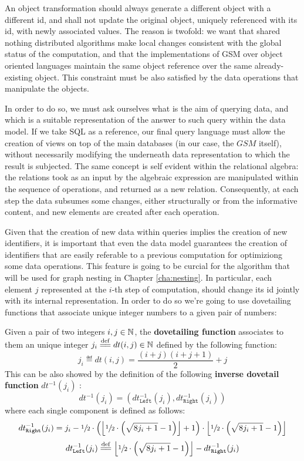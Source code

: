 An object transformation should always generate a different object with a different id, and shall not update the original object, uniquely referenced with its id, with newly associated values. The reason is twofold: we want that shared nothing distributed algorithms make local changes consistent with the global status of the computation, and that the implementations of GSM over object oriented languages maintain the same object reference over the same already-existing object.  This constraint must be also satisfied by the data operations that manipulate the objects.

In order to do so, we must ask ourselves what is the aim of querying data, and which is a suitable representation of the answer to such query within the data model. If we take SQL as a reference, our final query language must allow the creation of views on top of the main databases (in our case, the $GSM$ itself), without necessarily modifying the underneath data representation to which the result is subjected. The same concept is self evident within the relational algebra: the relations took as an input by the algebraic expression are manipulated within the sequence of operations, and returned as a new relation. Consequently, at each step the data subsumes some changes, either structurally or from the informative content, and new elements are created after each operation. 



Given that the creation of new data within queries implies the creation of new identifiers, it is important that even the data model guarantees the creation of identifiers that are easily referable to a previous computation \cite{bergami2014} for optimiziong some data operations. This feature is going to be curcial for the algorithm that will be used for graph nesting in Chapter \vref{cha:nesting}. In particular, each element $j$ represented at the $i$-th step of computation, should change its id  jointly with its internal representation. In order to do so we're going to use dovetailing functions \cite{odifreddi1992} that associate unique integer numbers to a given pair of numbers:

\begin{definition}
Given a pair of two integers $i,j\in \mathbb{N}$, the \textbf{dovetailing function} associates to them an unique integer  $j_i\overset{\mathrm{def}}{=\mathrel{\mkern-3mu}=} dt(i,j)\in\mathbb{N}$ defined by the following function:
\[j_i\eqdef dt(i,j)=\frac{(i+j)(i+j+1)}{2}+j\]
This can be also showed by the definition of the following \textbf{inverse dovetail function} $dt^{-1}(j_i)$ \cite{bergami2014}:
\[dt^{-1}(j_i)=(dt_{\texttt{Left}}^{-1}(j_i),dt_{\texttt{Right}}^{-1}(j_i))\]
where each single component is defined as follows:
\[dt_{\texttt{Right}}^{-1}(j_i)= j_i - \sfrac{1}{2}\cdot\left(\left\lfloor\sfrac{1}{2}\cdot{\left(\sqrt{8j_i+1}-1\right)}\right\rfloor + 1\right)\cdot \left\lfloor\sfrac{1}{2}\cdot{\left(\sqrt{8j_i+1}-1\right)}\right\rfloor\]
\[dt_{\texttt{Left}}^{-1}(j_i) \overset{\mathrm{def}}{=\mathrel{\mkern-3mu}=} \left\lfloor\sfrac{1}{2}\cdot{\left(\sqrt{8j_i+1}-1\right)}\right\rfloor - dt_{\texttt{Right}}^{-1}(j_i)\]
\end{definition}



